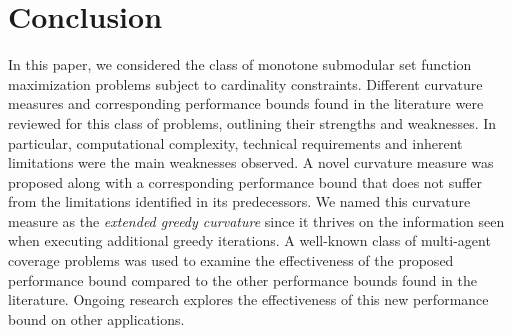 \documentclass[conference]{IEEEtran}
\begin{document}






\section{Conclusion}
\label{Sec:Conclusion}

In this paper, we considered the class of monotone submodular set function maximization problems subject to cardinality constraints. Different curvature measures and corresponding performance bounds found in the literature were reviewed for this class of problems, outlining their strengths and weaknesses. In particular, computational complexity, technical requirements and inherent limitations were the main weaknesses observed. A novel curvature measure was proposed along with a corresponding performance bound that does not suffer from the limitations identified in its predecessors. We named this curvature measure as the \emph{extended greedy curvature} since it thrives on the information seen when executing additional greedy iterations. A well-known class of multi-agent coverage problems was used to examine the effectiveness of the proposed performance bound compared to the other performance bounds found in the literature.  Ongoing research explores the effectiveness of this new performance bound on other applications.









\end{document}
